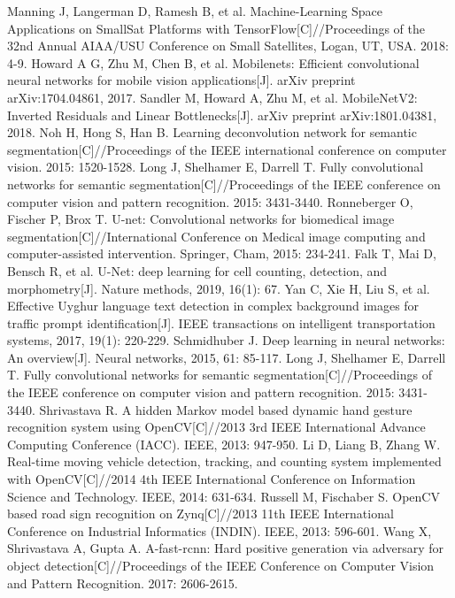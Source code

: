 \documentclass[22pt, UTF8]{article}
\numberwithin{figure}{section}
\numberwithin{table}{section}
\numberwithin{equation}{section} %
\begin{document}
\begin{thebibliography}{42}
\bibitem{}
Manning J, Langerman D, Ramesh B, et al. Machine-Learning Space Applications on SmallSat Platforms with TensorFlow[C]//Proceedings of the 32nd Annual AIAA/USU Conference on Small Satellites, Logan, UT, USA. 2018: 4-9.
\bibitem{}
Howard A G, Zhu M, Chen B, et al. Mobilenets: Efficient convolutional neural networks for mobile vision applications[J]. arXiv preprint arXiv:1704.04861, 2017.
\bibitem{}
Sandler M, Howard A, Zhu M, et al. MobileNetV2: Inverted Residuals and Linear Bottlenecks[J]. arXiv preprint arXiv:1801.04381, 2018.
\bibitem{}
Noh H, Hong S, Han B. Learning deconvolution network for semantic segmentation[C]//Proceedings of the IEEE international conference on computer vision. 2015: 1520-1528.
\bibitem{}
Long J, Shelhamer E, Darrell T. Fully convolutional networks for semantic segmentation[C]//Proceedings of the IEEE conference on computer vision and pattern recognition. 2015: 3431-3440.
\bibitem{}
Ronneberger O, Fischer P, Brox T. U-net: Convolutional networks for biomedical image segmentation[C]//International Conference on Medical image computing and computer-assisted intervention. Springer, Cham, 2015: 234-241.
\bibitem{}
Falk T, Mai D, Bensch R, et al. U-Net: deep learning for cell counting, detection, and morphometry[J]. Nature methods, 2019, 16(1): 67.
\bibitem{}
Yan C, Xie H, Liu S, et al. Effective Uyghur language text detection in complex background images for traffic prompt identification[J]. IEEE transactions on intelligent transportation systems, 2017, 19(1): 220-229.
\bibitem{}
Schmidhuber J. Deep learning in neural networks: An overview[J]. Neural networks, 2015, 61: 85-117.
\bibitem{}
Long J, Shelhamer E, Darrell T. Fully convolutional networks for semantic segmentation[C]//Proceedings of the IEEE conference on computer vision and pattern recognition. 2015: 3431-3440.
\bibitem{}
Shrivastava R. A hidden Markov model based dynamic hand gesture recognition system using OpenCV[C]//2013 3rd IEEE International Advance Computing Conference (IACC). IEEE, 2013: 947-950.
\bibitem{}
Li D, Liang B, Zhang W. Real-time moving vehicle detection, tracking, and counting system implemented with OpenCV[C]//2014 4th IEEE International Conference on Information Science and Technology. IEEE, 2014: 631-634.
\bibitem{}
Russell M, Fischaber S. OpenCV based road sign recognition on Zynq[C]//2013 11th IEEE International Conference on Industrial Informatics (INDIN). IEEE, 2013: 596-601.
\bibitem{}
Wang X, Shrivastava A, Gupta A. A-fast-rcnn: Hard positive generation via adversary for object detection[C]//Proceedings of the IEEE Conference on Computer Vision and Pattern Recognition. 2017: 2606-2615.

\end{thebibliography}
\end{document}
